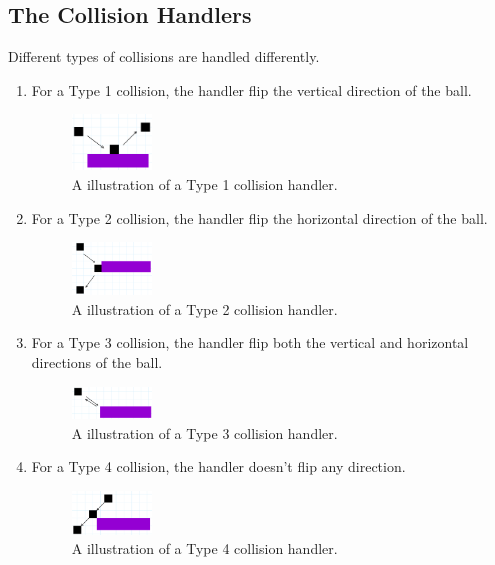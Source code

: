 \documentclass{article}
\begin{document}
\subsection{The Collision Handlers}

Different types of collisions are handled differently.

\begin{enumerate}
    \item For a Type 1 collision, the handler flip the vertical direction of the ball. 
    \begin{figure}[h!]
        \centering
        \includegraphics[width=0.2\textwidth]{collision_4.png}
        \caption{A illustration of a Type 1 collision handler.}
    \end{figure}

    \newpage
    
    \item For a Type 2 collision, the handler flip the horizontal direction of the ball.
    \begin{figure}[h!]
        \centering
        \includegraphics[width=0.2\textwidth]{collision_5.png}
        \caption{A illustration of a Type 2 collision handler.}
    \end{figure}
    \item For a Type 3 collision, the handler flip both the vertical and horizontal directions of the ball. 
    \begin{figure}[h!]
        \centering
        \includegraphics[width=0.2\textwidth]{collision_6.png}
        \caption{A illustration of a Type 3 collision handler.}
    \end{figure}
    \item For a Type 4 collision, the handler doesn't flip any direction.
    \begin{figure}[h!]
        \centering
        \includegraphics[width=0.2\textwidth]{collision_7.png}
        \caption{A illustration of a Type 4 collision handler.}
    \end{figure}
\end{enumerate}
\end{document}
